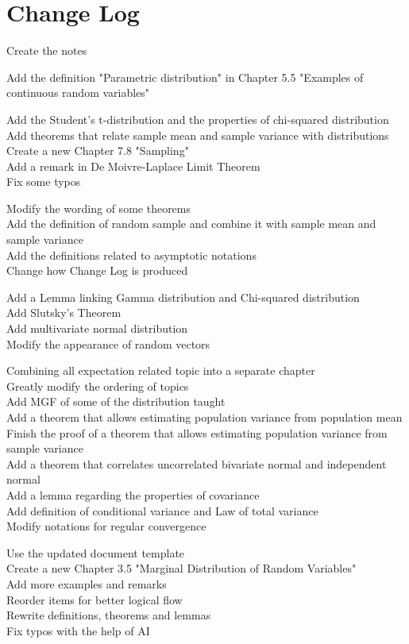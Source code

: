 \documentclass{huhtakm-template-book-v2}
\begin{document}
\chapter*{Change Log}
\begin{description}[style = nextline]
	\item[1.0]
	Create the notes
	\item[1.1]
	Add the definition "Parametric distribution" in Chapter 5.5 "Examples of continuous random variables"
	\item[1.2]
	Add the Student's t-distribution and the properties of chi-squared distribution\\
	Add theorems that relate sample mean and sample variance with distributions\\
	Create a new Chapter 7.8 "Sampling"\\
	Add a remark in De Moivre-Laplace Limit Theorem\\
	Fix some typos
	\item[1.3]
	Modify the wording of some theorems\\
	Add the definition of random sample and combine it with sample mean and sample variance\\
	Add the definitions related to asymptotic notations\\
	Change how Change Log is produced
	\item[1.4] Add a Lemma linking Gamma distribution and Chi-squared distribution\\
	Add Slutsky's Theorem\\
	Add multivariate normal distribution\\
	Modify the appearance of random vectors
	\item[2.0]
	Combining all expectation related topic into a separate chapter\\
	Greatly modify the ordering of topics\\
	Add MGF of some of the distribution taught\\
	Add a theorem that allows estimating population variance from population mean\\
	Finish the proof of a theorem that allows estimating population variance from sample variance\\
	Add a theorem that correlates uncorrelated bivariate normal and independent normal\\
	Add a lemma regarding the properties of covariance\\
	Add definition of conditional variance and Law of total variance\\
	Modify notations for regular convergence
	\item[2.1]
	Use the updated document template\\
	Create a new Chapter 3.5 "Marginal Distribution of Random Variables"\\
	Add more examples and remarks\\
	Reorder items for better logical flow\\
	Rewrite definitions, theorems and lemmas\\
	Fix typos with the help of AI\\
\end{description}
\end{document}
